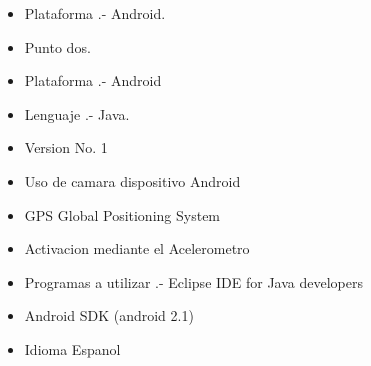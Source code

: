 \documentclass[12pt,letterpaper]{article}
\begin{document}
   \begin{itemize}
   
   \item Plataforma .- Android.
   \item Punto dos.
   \item Plataforma .- Android
   \item Lenguaje .- Java.
   \item Version No. 1
   \item Uso de camara dispositivo Android
   \item GPS Global Positioning System
   \item Activacion mediante el Acelerometro
   \item Programas a utilizar .- Eclipse IDE for Java developers
   \item Android SDK (android 2.1)
   \item Idioma{\tiny } Espanol
   
   
   \end{itemize}
\end{document}
